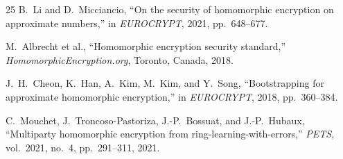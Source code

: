 \documentclass[conference]{IEEEtran}
\begin{document}
\begin{thebibliography}{25}
B.~Li and D.~Micciancio, ``On the security of homomorphic encryption on approximate numbers,'' in \emph{EUROCRYPT}, 2021, pp.~648--677.

M.~Albrecht et al., ``Homomorphic encryption security standard,'' \emph{HomomorphicEncryption.org}, Toronto, Canada, 2018.

J.~H.~Cheon, K.~Han, A.~Kim, M.~Kim, and Y.~Song, ``Bootstrapping for approximate homomorphic encryption,'' in \emph{EUROCRYPT}, 2018, pp.~360--384.

C.~Mouchet, J.~Troncoso-Pastoriza, J.-P.~Bossuat, and J.-P.~Hubaux, ``Multiparty homomorphic encryption from ring-learning-with-errors,'' \emph{PETS}, vol.~2021, no.~4, pp.~291--311, 2021.

\end{thebibliography}
\end{document}
